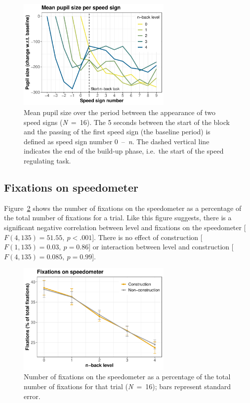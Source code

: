 \begin{figure}
  \centering
  \includegraphics[width=7.5cm]{images/speed_sign_nback.pdf}
  \caption{Mean pupil size over the period between the appearance of two speed signs (\textit{N}\ =\ 16).
  The 5 seconds between the start of the block and the passing of the first speed sign (the baseline period) is defined as speed sign number 0\ --\ \textit{n}.
  The dashed vertical line indicates the end of the build-up phase, i.e.\ the start of the speed regulating task.}
  \label{fig:ps-speed-sign}
\end{figure}

\subsection{Fixations on speedometer}
Figure~\ref{fig:fix-speedometer} shows the number of fixations on the speedometer as a percentage of the total number of fixations for a trial.
Like this figure suggests, there is a significant negative correlation between \nback level and fixations on the speedometer [\(F(4,135)=51.55,\ p<.001\)].
There is no effect of construction [\(F(1,135)=0.03,\ p=0.86\)] or interaction between \nback level and construction [\(F(4,135)=0.085,\ p=0.99\)]. 

\begin{figure}
  \centering
  \includegraphics[width=7.5cm]{images/speedometer_interaction.pdf}
  \caption{Number of fixations on the speedometer as a percentage of the total number of fixations for that trial (\textit{N}\ =\ 16); bars represent standard error.}
  \label{fig:fix-speedometer}
\end{figure}